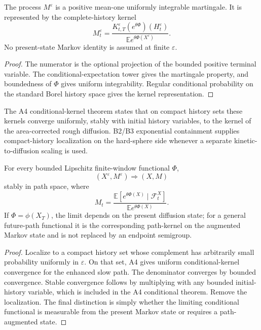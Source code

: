 \begin{lemma}
\label{lem:r6-c2-likelihood}
The process \(M^\varepsilon\) is a positive mean-one uniformly integrable
martingale.  It is represented by the complete-history kernel
\[
M_t^\varepsilon=
\frac{K_{t,T}^\varepsilon
(e^{\theta\Phi})(H_t^\varepsilon)}
{\mathbb E e^{\theta\Phi(X^\varepsilon)}}.
\]
No present-state Markov identity is assumed at finite \(\varepsilon\).
\end{lemma}

\begin{proof}
The numerator is the optional projection of the bounded positive terminal
variable.  The conditional-expectation tower gives the martingale property,
and boundedness of \(\Phi\) gives uniform integrability.  Regular conditional
probability on the standard Borel history space gives the kernel
representation.
\end{proof}

The A4 conditional-kernel theorem states that on compact history sets these
kernels converge uniformly, stably with initial history variables, to the
kernel of the area-corrected rough diffusion.  B2/B3 exponential containment
supplies compact-history localization on the hard-sphere side whenever a
separate kinetic-to-diffusion scaling is used.

\begin{theorem}
\label{thm:r6-c2-optional}
For every bounded Lipschitz finite-window functional \(\Phi\),
\[
(X^\varepsilon,M^\varepsilon)\Longrightarrow(X,M)
\]
stably in path space, where
\[
M_t=
\frac{
\mathbb E[e^{\theta\Phi(X)}\mid\mathcal F_t^X]
}{
\mathbb E e^{\theta\Phi(X)}
}.
\]
If \(\Phi=\phi(X_T)\), the limit depends on the present diffusion state; for a
general future-path functional it is the corresponding path-kernel on the
augmented Markov state and is not replaced by an endpoint semigroup.
\end{theorem}

\begin{proof}
Localize to a compact history set whose complement has arbitrarily small
probability uniformly in \(\varepsilon\).  On that set, A4 gives uniform
conditional-kernel convergence for the enhanced slow path.  The denominator
converges by bounded convergence.  Stable convergence follows by multiplying
with any bounded initial-history variable, which is included in the A4
conditional theorem.  Remove the localization.  The final distinction is
simply whether the limiting conditional functional is measurable from the
present Markov state or requires a path-augmented state.
\end{proof}


